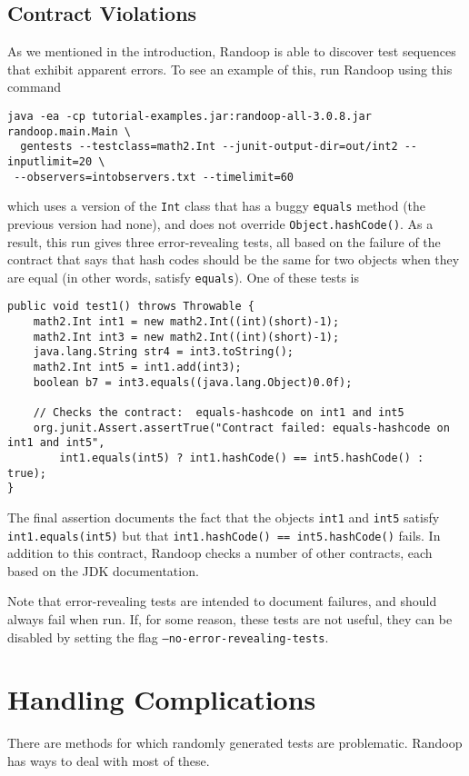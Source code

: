 \documentclass[11pt, oneside]{article} %
\newcommand{\code}[1]{{\texttt{#1}}}
\newcommand{\cmd}[1]{{\texttt{#1}}}
\begin{document}
\subsection{Contract Violations}
As we mentioned in the introduction, Randoop is able to discover test sequences that exhibit apparent errors. 
To see an example of this, run Randoop using this command
\begin{verbatim}
java -ea -cp tutorial-examples.jar:randoop-all-3.0.8.jar randoop.main.Main \
  gentests --testclass=math2.Int --junit-output-dir=out/int2 --inputlimit=20 \
 --observers=intobservers.txt --timelimit=60
\end{verbatim}
which uses a version of the \code{Int} class that has a buggy \code{equals} method (the previous version had none), and does not override \code{Object.hashCode()}.
As a result, this run gives three error-revealing tests, all based on the failure of the contract that says that hash codes should be the same for two objects when they are equal (in other words, satisfy \code{equals}).
One of these tests is
\begin{verbatim}
public void test1() throws Throwable {
    math2.Int int1 = new math2.Int((int)(short)-1);
    math2.Int int3 = new math2.Int((int)(short)-1);
    java.lang.String str4 = int3.toString();
    math2.Int int5 = int1.add(int3);
    boolean b7 = int3.equals((java.lang.Object)0.0f);
    
    // Checks the contract:  equals-hashcode on int1 and int5
    org.junit.Assert.assertTrue("Contract failed: equals-hashcode on int1 and int5", 
        int1.equals(int5) ? int1.hashCode() == int5.hashCode() : true);
} 
\end{verbatim}
The final assertion documents the fact that the objects \code{int1} and \code{int5} satisfy \code{int1.equals(int5)} but that \code{int1.hashCode() == int5.hashCode()} fails.
In addition to this contract, Randoop checks a number of other contracts, each based on the JDK documentation.

Note that error-revealing tests are intended to document failures, and should always fail when run. If, for some reason, these tests are not useful, they can be disabled by setting the flag \cmd{--no-error-revealing-tests}. 


\section{Handling Complications}

There are methods for which randomly generated tests are problematic.
Randoop has ways to deal with most of these.
\end{document}

